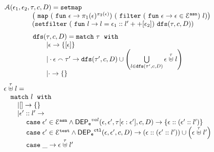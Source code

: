 \begin{defn}
\[
\begin{array}{l}
	\mathcal{A}(\event_1, \event_2, \trace, c, D)
	= 
	\kw{setmap} ~
	\\ \qquad \qquad
	\left(\emap 
		(\efun  \event \to \pi_1(\event)^{\pi_2(\event)})	
	~
	(\efilter 
		(\efun \event \to  \event \in \eventset^{\asn}) ~ l) \right)
	\\ \qquad \qquad
	(\kw{setfilter} ~
		(\efun l \to l = \event_1 :: l' ++ [\event_2]) ~ \kw{dfs}(\trace, c, D))
	\end{array}
\]
%
%
\[
\begin{array}{l}
	\kw{dfs}(\trace, c, D)
	= 
	\ematch~  \trace ~ \ewith
	\\ \qquad
	| \event \to \{[\event]\}
	\\ \qquad
	|  \cdot \event \tracecat \trace' \to  
	\kw{dfs}(\trace', c, D)
	\cup 
	\left(   \bigcup\limits_{l \in \kw{dfs}(\trace', c, D) }
	\event \stackrel{\trace}{\uplus} l 
	\right)
	\\ \qquad
	| \cdot \to \{\}
\end{array}
\]
%
%
\[
\begin{array}{l}
	\event \stackrel{\trace}{\uplus} l
	= 
	\\ \quad
	\ematch~  l ~ \ewith
	\\ \qquad
	| [] \to \{\}
	\\ \qquad
	|  \event' :: l' \to  
	\\ \quad \qquad 	
	\ecase \event' \in \eventset^{\asn}  \land \eventdep^{val}(\event, \event', \trace[\event:\event'], c, D)
	\to \left\{ \event::(\event' :: l') \right\}
	\\ \quad \qquad 	
	\ecase \event' \in \eventset^{\test} \land \eventdep^{\ctl}(\event, \event', c, D)
	\to (\event::(\event' :: l')) \cup \left( \event \stackrel{\trace}{\uplus} l' \right)
	\\ \quad \qquad 	
	\ecase \_ \to \event \stackrel{\trace}{\uplus} l' 
\end{array}
\]
\end{defn}
